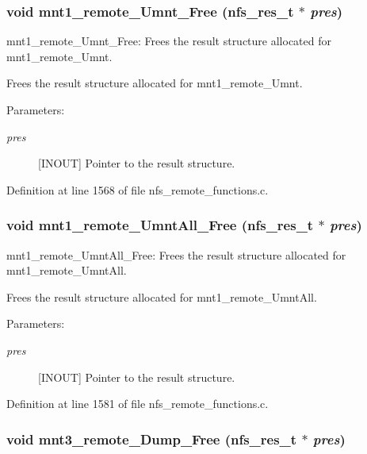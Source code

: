 \subsubsection{\setlength{\rightskip}{0pt plus 5cm}void mnt1\_\-remote\_\-Umnt\_\-Free (nfs\_\-res\_\-t $\ast$ {\em pres})}\label{group__NFSprocs_ga46}


mnt1\_\-remote\_\-Umnt\_\-Free: Frees the result structure allocated for mnt1\_\-remote\_\-Umnt.

Frees the result structure allocated for mnt1\_\-remote\_\-Umnt.

\begin{Desc}
\item[Parameters:]
\begin{description}
\item[{\em pres}][INOUT] Pointer to the result structure. \end{description}
\end{Desc}


Definition at line 1568 of file nfs\_\-remote\_\-functions.c.
\subsubsection{\setlength{\rightskip}{0pt plus 5cm}void mnt1\_\-remote\_\-Umnt\-All\_\-Free (nfs\_\-res\_\-t $\ast$ {\em pres})}\label{group__NFSprocs_ga47}


mnt1\_\-remote\_\-Umnt\-All\_\-Free: Frees the result structure allocated for mnt1\_\-remote\_\-Umnt\-All.

Frees the result structure allocated for mnt1\_\-remote\_\-Umnt\-All.

\begin{Desc}
\item[Parameters:]
\begin{description}
\item[{\em pres}][INOUT] Pointer to the result structure. \end{description}
\end{Desc}


Definition at line 1581 of file nfs\_\-remote\_\-functions.c.
\subsubsection{\setlength{\rightskip}{0pt plus 5cm}void mnt3\_\-remote\_\-Dump\_\-Free (nfs\_\-res\_\-t $\ast$ {\em pres})}\label{group__NFSprocs_ga49}


